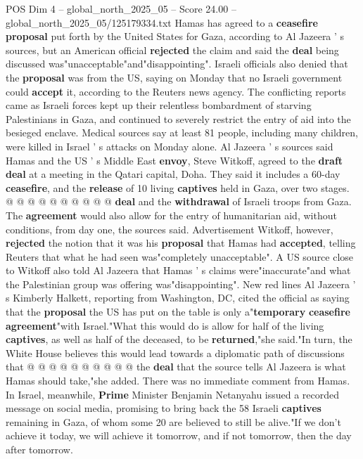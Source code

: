 \begin{textsample}{POS Dim 4 – global\_north\_2025\_05 – Score 24.00 – global\_north\_2025\_05/125179334.txt}  \label{ex:f4_pos_198}
Hamas has agreed to a \textbf{ceasefire} \textbf{proposal} put forth by the United States for Gaza, according to Al Jazeera ' s sources, but an American official \textbf{rejected} the claim and said the \textbf{deal} being discussed was"unacceptable"and"disappointing".
Israeli officials also denied that the \textbf{proposal} was from the US, saying on Monday that no Israeli government could \textbf{accept} it, according to the Reuters news agency.
The conflicting reports came as Israeli forces kept up their relentless bombardment of starving Palestinians in Gaza, and continued to severely restrict the entry of aid into the besieged enclave.
Medical sources say at least 81 people, including many children, were killed in Israel ' s attacks on Monday alone.
Al Jazeera ' s sources said Hamas and the US ' s Middle East \textbf{envoy}, Steve Witkoff, agreed to the \textbf{draft} \textbf{deal} at a meeting in the Qatari capital, Doha.
They said it includes a 60-day \textbf{ceasefire}, and the \textbf{release} of 10 living \textbf{captives} held in Gaza, over two stages. @ @ @ @ @ @ @ @ @ @ \textbf{deal} and the \textbf{withdrawal} of Israeli troops from Gaza.
The \textbf{agreement} would also allow for the entry of humanitarian aid, without conditions, from day one, the sources said.
Advertisement Witkoff, however, \textbf{rejected} the notion that it was his \textbf{proposal} that Hamas had \textbf{accepted}, telling Reuters that what he had seen was"completely unacceptable".
A US source close to Witkoff also told Al Jazeera that Hamas ' s claims were"inaccurate"and what the Palestinian group was offering was"disappointing".
New red lines Al Jazeera ' s Kimberly Halkett, reporting from Washington, DC, cited the official as saying that the \textbf{proposal} the US has put on the table is only a"\textbf{temporary} \textbf{ceasefire} \textbf{agreement}"with Israel."What this would do is allow for half of the living \textbf{captives}, as well as half of the deceased, to be \textbf{returned},"she said."In turn, the White House believes this would lead towards a diplomatic path of discussions that @ @ @ @ @ @ @ @ @ @ the \textbf{deal} that the source tells Al Jazeera is what Hamas should take,"she added.
There was no immediate comment from Hamas.
In Israel, meanwhile, \textbf{Prime} Minister Benjamin Netanyahu issued a recorded message on social media, promising to bring back the 58 Israeli \textbf{captives} remaining in Gaza, of whom some 20 are believed to still be alive."If we don't achieve it today, we will achieve it tomorrow, and if not tomorrow, then the day after tomorrow.

\end{textsample}
